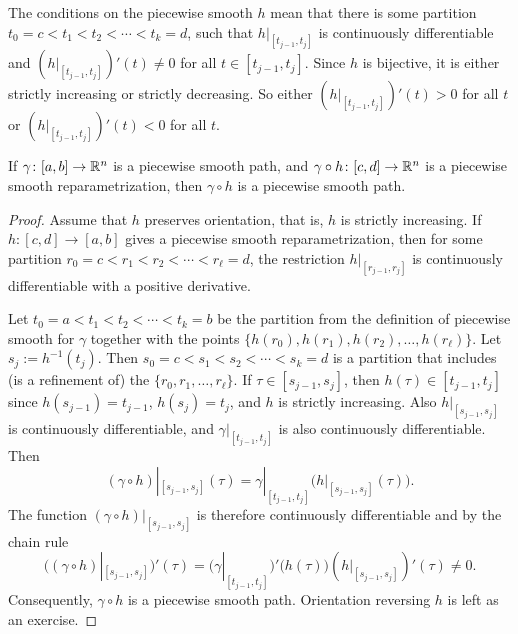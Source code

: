 The conditions on the piecewise smooth $h$ mean that
there is some partition $t_0 = c < t_1 < t_2 < \cdots < t_k = d$,
such that $h|_{[t_{j-1},t_j]}$ is continuously differentiable
and $(h|_{[t_{j-1},t_j]})'(t) \not= 0$ for all $t \in [t_{j-1},t_j]$.
Since $h$ is bijective, it is either strictly increasing or
strictly decreasing.  So either $(h|_{[t_{j-1},t_j]})'(t) > 0$
for all $t$ or $(h|_{[t_{j-1},t_j]})'(t) < 0$ for all $t$.

\begin{prop} \label{prop:reparamapiecewisesmooth}
If $\gamma \colon [a,b] \to {\mathbb{R}}^n$ is a piecewise smooth path,
and $\gamma \circ h \colon [c,d] \to {\mathbb{R}}^n$ is
a piecewise smooth reparametrization, then $\gamma \circ h$
is a piecewise smooth path.
\end{prop}

\begin{proof}
Assume that $h$ preserves orientation, that is, $h$ is strictly
increasing.
If $h \colon [c,d] \to [a,b]$ gives a piecewise smooth reparametrization,
then for some partition
$r_0 = c < r_1 < r_2 < \cdots < r_\ell = d$, the restriction
$h|_{[r_{j-1},r_j]}$ is continuously differentiable with a positive
derivative.

Let $t_0 = a < t_1 < t_2 < \cdots < t_k = b$ be the partition from the
definition of piecewise smooth for $\gamma$ together with the 
points $\{ h(r_0), h(r_1), h(r_2), \ldots, h(r_\ell) \}$.
Let $s_j := h^{-1}(t_j)$.  Then
$s_0 = c < s_1 < s_2 < \cdots < s_k = d$
is a partition that includes (is a refinement of) the
$\{ r_0,r_1,\ldots,r_\ell \}$.
If $\tau \in [s_{j-1},s_j]$, then $h(\tau) \in [t_{j-1},t_j]$
since $h(s_{j-1}) = t_{j-1}$,
$h(s_{j}) = t_j$, and
$h$ is strictly increasing.
Also $h|_{[s_{j-1},s_j]}$ is continuously differentiable, and
$\gamma|_{[t_{j-1},t_j]}$ is also continuously differentiable.
Then
\begin{equation*}
(\gamma \circ h)|_{[s_{j-1},s_{j}]} (\tau)
=
\gamma|_{[t_{j-1},t_{j}]} \bigl( h|_{[s_{j-1},s_j]}(\tau) \bigr) .
\end{equation*}
The function 
$(\gamma \circ h)|_{[s_{j-1},s_{j}]}$ is therefore continuously
differentiable and
by the chain rule
\begin{equation*}
\bigl( (\gamma \circ h)|_{[s_{j-1},s_{j}]} \bigr) ' (\tau)
=
\bigl( \gamma|_{[t_{j-1},t_{j}]} \bigr)' \bigl( h(\tau) \bigr)
(h|_{[s_{j-1},s_j]})'(\tau) \not= 0 .
\end{equation*}
Consequently, $\gamma \circ h$ is a piecewise smooth path.
Orientation reversing $h$ is left as an exercise.
\end{proof}

